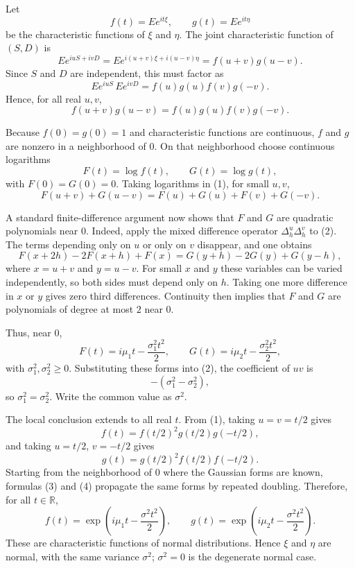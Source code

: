 \begin{solution}
Let
\[
f(t)=E e^{it\xi},\qquad g(t)=E e^{it\eta}
\]
be the characteristic functions of $\xi$ and $\eta$. The joint characteristic function of $(S,D)$ is
\[
E e^{iuS+ivD}
=E e^{i(u+v)\xi+i(u-v)\eta}
=f(u+v)g(u-v).
\]
Since $S$ and $D$ are independent, this must factor as
\[
E e^{iuS}\,E e^{ivD}
=f(u)g(u)f(v)g(-v).
\]
Hence, for all real $u,v$,
\[
f(u+v)g(u-v)=f(u)g(u)f(v)g(-v). \tag{1}
\]

Because $f(0)=g(0)=1$ and characteristic functions are continuous, $f$ and $g$ are nonzero in a neighborhood of $0$. On that neighborhood choose continuous logarithms
\[
F(t)=\log f(t),\qquad G(t)=\log g(t),
\]
with $F(0)=G(0)=0$. Taking logarithms in (1), for small $u,v$,
\[
F(u+v)+G(u-v)=F(u)+G(u)+F(v)+G(-v). \tag{2}
\]

A standard finite-difference argument now shows that $F$ and $G$ are quadratic polynomials near $0$. Indeed, apply the mixed difference operator $\Delta_h^u\Delta_h^v$ to (2). The terms depending only on $u$ or only on $v$ disappear, and one obtains
\[
F(x+2h)-2F(x+h)+F(x)
=G(y+h)-2G(y)+G(y-h),
\]
where $x=u+v$ and $y=u-v$. For small $x$ and $y$ these variables can be varied independently, so both sides must depend only on $h$. Taking one more difference in $x$ or $y$ gives zero third differences. Continuity then implies that $F$ and $G$ are polynomials of degree at most $2$ near $0$.

Thus, near $0$,
\[
F(t)=i\mu_1t-\frac{\sigma_1^2t^2}{2},
\qquad
G(t)=i\mu_2t-\frac{\sigma_2^2t^2}{2},
\]
with $\sigma_1^2,\sigma_2^2\geq 0$. Substituting these forms into (2), the coefficient of $uv$ is
\[
-(\sigma_1^2-\sigma_2^2),
\]
so $\sigma_1^2=\sigma_2^2$. Write the common value as $\sigma^2$.

The local conclusion extends to all real $t$. From (1), taking $u=v=t/2$ gives
\[
f(t)={f(t/2)}^2 g(t/2)g(-t/2), \tag{3}
\]
and taking $u=t/2$, $v=-t/2$ gives
\[
g(t)={g(t/2)}^2 f(t/2)f(-t/2). \tag{4}
\]
Starting from the neighborhood of $0$ where the Gaussian forms are known, formulas (3) and (4) propagate the same forms by repeated doubling. Therefore, for all $t\in\mathbb{R}$,
\[
f(t)=\exp\left(i\mu_1t-\frac{\sigma^2t^2}{2}\right),
\qquad
g(t)=\exp\left(i\mu_2t-\frac{\sigma^2t^2}{2}\right).
\]
These are characteristic functions of normal distributions. Hence $\xi$ and $\eta$ are normal, with the same variance $\sigma^2$; $\sigma^2=0$ is the degenerate normal case.
\end{solution}
